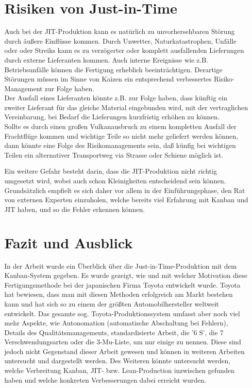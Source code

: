 \section{Risiken von Just-in-Time}
Auch bei der JIT-Produktion kann es natürlich zu unvorhersehbaren Störung durch äußere Einflüsse kommen.
Durch Unwetter, Naturkatastrophen, Unfälle oder oder Streiks kann es zu verzögerter oder komplett ausfallenden Lieferungen durch externe Lieferanten kommen.
Auch interne Ereignisse wie z.B. Betriebsunfälle können die Fertigung erheblich beeinträchtigen.
Derartige Störungen müssen im Sinne von Kaizen ein entsprechend verbessertes Risiko-Management zur Folge haben.\\
Der Ausfall eines Lieferanten könnte z.B. zur Folge haben, dass künftig ein zweiter Lieferant für das 
gleiche Material eingebunden wird, mit der vertraglichen Vereinbarung, bei Bedarf die Lieferungen kurzfristig erhöhen zu können.\\
Sollte es durch einen großen Vulkanausbruch zu einem kompletten Ausfall der Frachtflüge kommen und 
wichtige Teile so nicht mehr geliefert werden können, dann könnte eine Folge des Risikomanagements sein, 
daß künfig bei wichtigen Teilen ein alternativer Transportweg via Strasse oder Schiene möglich ist.

Ein weitere Gefahr besteht darin, dass die JIT-Produktion nicht richtig umgesetzt wird, wobei auch schon Kleinigkeiten entscheidend sein können.
Grundsätzlich empfielt es sich daher vor allem in der Einführungsphase, den Rat von externen Experten einzuholen, 
welche bereits viel Erfahrung mit Kanban und JIT haben, und so die Fehler erkennen können.

\section{Fazit und Ausblick}
In der Arbeit wurde ein Überblick über die Just-in-Time-Produktion mit dem Kanban-System gegeben.
Es wurde gezeigt, wie und mit welcher Motivation diese Fertigungsmethode bei der japanischen Firma Toyota entwickelt wurde.
Toyota hat bewiesen, dass man mit diesen Methoden erfolgreich am Markt bestehen kann und hat sich so zu einem der größten Automobilhersteller weltweit entwickelt.
Das gesamte sog. Toyota-Produktionssystem umfasst aber noch viel mehr Aspekte, wie Autonomation (automatische Abschaltung bei Fehlern), 
Details des Qualitätsmanagements, standardisierte Arbeit, die '6 S', die 7 Verschwendungsarten oder die 3-Mu-Liste, um nur einige zu nennen. 
Diese sind jedoch nicht Gegenstand dieser Arbeit gewesen und können in weiteren Arbeiten untersucht und dargestellt werden. Des Weiteren könnte untersucht werden, 
welche Verbreitung Kanban, JIT- bzw. Lean-Production inzwischen gefunden haben und welche konkreten Verbesserungen dabei erreicht wurden.

